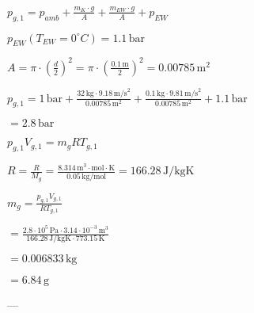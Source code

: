 \( p_{g,1} = p_{amb} + \frac{m_K \cdot g}{A} + \frac{m_{EW} \cdot g}{A} + p_{EW} \)  

\( p_{EW} (T_{EW} = 0^\circ C) = 1.1 \, \text{bar} \)  

\( A = \pi \cdot \left(\frac{d}{2}\right)^2 = \pi \cdot \left(\frac{0.1 \, \text{m}}{2}\right)^2 = 0.00785 \, \text{m}^2 \)  

\( p_{g,1} = 1 \, \text{bar} + \frac{32 \, \text{kg} \cdot 9.18 \, \text{m/s}^2}{0.00785 \, \text{m}^2} + \frac{0.1 \, \text{kg} \cdot 9.81 \, \text{m/s}^2}{0.00785 \, \text{m}^2} + 1.1 \, \text{bar} \)  

\( = 2.8 \, \text{bar} \)  

\( p_{g,1} V_{g,1} = m_g R T_{g,1} \)  

\( R = \frac{R}{M_g} = \frac{8.314 \, \text{m}^3 \cdot \text{mol} \cdot \text{K}}{0.05 \, \text{kg/mol}} = 166.28 \, \text{J/kgK} \)  

\( m_g = \frac{p_{g,1} V_{g,1}}{R T_{g,1}} \)  

\( = \frac{2.8 \cdot 10^5 \, \text{Pa} \cdot 3.14 \cdot 10^{-3} \, \text{m}^3}{166.28 \, \text{J/kgK} \cdot 773.15 \, \text{K}} \)  

\( = 0.006833 \, \text{kg} \)  

\( = 6.84 \, \text{g} \)  

---